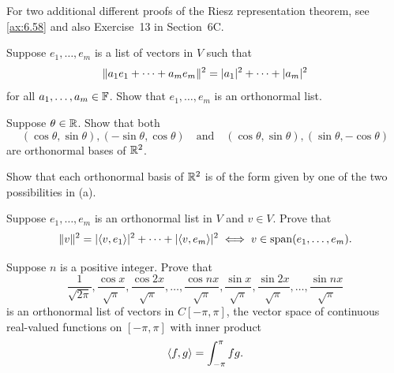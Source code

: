 For two additional different proofs of the Riesz representation theorem, see
\ref{ax:6.58} and also Exercise~13 in Section~6C.

\begin{exc}

\begin{exercise}
Suppose $e_1,\dots,e_m$ is a list of vectors in $V$ such that
\[ \lVert a_1e_1+\cdots+a_me_m \rVert^2 = \lvert a_1 \rvert^2+\cdots+\lvert a_m \rvert^2 \]
for all $a_1,\dots,a_m\in\mathbb{F}$. Show that $e_1,\dots,e_m$ is an orthonormal list.
\end{exercise}

\begin{exercise}\leavevmode
\begin{parts}
\item Suppose $\theta\in\mathbb{R}$. Show that both
  \[ (\cos\theta,\sin\theta), (-\sin\theta,\cos\theta) \quad\text{and}\quad
     (\cos\theta,\sin\theta), (\sin\theta,-\cos\theta) \]
  are orthonormal bases of $\mathbb{R}^2$.
\item Show that each orthonormal basis of $\mathbb{R}^2$ is of the form given by one of
  the two possibilities in (a).
\end{parts}
\end{exercise}

\begin{exercise}
Suppose $e_1,\dots,e_m$ is an orthonormal list in $V$ and $v\in V$. Prove that
\[ \lVert v \rVert^2 = \lvert \langle v, e_1 \rangle \rvert^2+\cdots+\lvert \langle v, e_m \rangle \rvert^2
   \iff v\in\operatorname{span}(e_1,\dots,e_m). \]
\end{exercise}

\begin{exercise}
Suppose $n$ is a positive integer. Prove that
\[ \frac{1}{\sqrt{2\pi}}, \frac{\cos x}{\sqrt\pi}, \frac{\cos 2x}{\sqrt\pi},
   \dots, \frac{\cos nx}{\sqrt\pi}, \frac{\sin x}{\sqrt\pi},
   \frac{\sin 2x}{\sqrt\pi}, \dots, \frac{\sin nx}{\sqrt\pi} \]
is an orthonormal list of vectors in $C[-\pi,\pi]$, the vector space of
continuous real-valued functions on $[-\pi,\pi]$ with inner product
\[ \langle f, g \rangle = \int_{-\pi}^{\pi} fg. \]
\end{exercise}


\end{exc}
